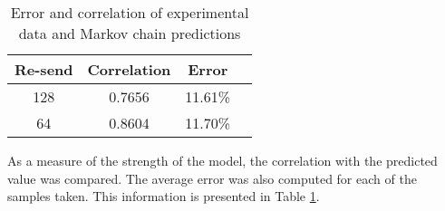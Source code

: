 \begin{table}
\caption{Error and correlation of experimental data and Markov chain predictions}
\label{tab:STAT-DATA}
\centering
\begin{tabular}{|c||c|c|c|}
\hline
Re-send & Correlation & Error \\ \hline
128 & 0.7656 & 11.61\% \\ \hline
64 & 0.8604 & 11.70\% \\ \hline
\end{tabular}
\end{table}

As a measure of the strength of the model, the correlation with the predicted value was compared.
The average error was also computed for each of the samples taken. This information is presented in
Table \ref{tab:STAT-DATA}.



